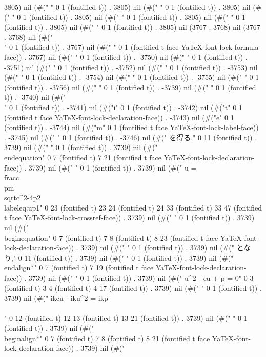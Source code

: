 3805) nil (#(" " 0 1 (fontified t)) . 3805) nil (#(" " 0 1 (fontified t)) . 3805) nil (#(" " 0 1 (fontified t)) . 3805) nil (#(" " 0 1 (fontified t)) . 3805) nil (#(" " 0 1 (fontified t)) . 3805) nil (#(" " 0 1 (fontified t)) . 3805) nil (3767 . 3768) nil (3767 . 3768) nil (#("\\" 0 1 (fontified t)) . 3767) nil (#("	" 0 1 (fontified t face YaTeX-font-lock-formula-face)) . 3767) nil (#(" " 0 1 (fontified t)) . -3750) nil (#(" " 0 1 (fontified t)) . -3751) nil (#(" " 0 1 (fontified t)) . -3752) nil (#(" " 0 1 (fontified t)) . -3753) nil (#(" " 0 1 (fontified t)) . -3754) nil (#(" " 0 1 (fontified t)) . -3755) nil (#(" " 0 1 (fontified t)) . -3756) nil (#("
" 0 1 (fontified t)) . -3739) nil (#(" " 0 1 (fontified t)) . -3740) nil (#("\\" 0 1 (fontified t)) . -3741) nil (#("i" 0 1 (fontified t)) . -3742) nil (#("t" 0 1 (fontified t face YaTeX-font-lock-declaration-face)) . -3743) nil (#("e" 0 1 (fontified t)) . -3744) nil (#("m" 0 1 (fontified t face YaTeX-font-lock-label-face)) . -3745) nil (#(" " 0 1 (fontified t)) . -3746) nil (#("       を得る." 0 11 (fontified t)) . 3739) nil (#("
" 0 1 (fontified t)) . 3739) nil (#("       \\end{equation}" 0 7 (fontified t) 7 21 (fontified t face YaTeX-font-lock-declaration-face)) . 3739) nil (#("
" 0 1 (fontified t)) . 3739) nil (#("	u = \\frac{c\\pm\\sqrt{c^2-4p}}{2} \\label{eq:up1}" 0 23 (fontified t) 23 24 (fontified t) 24 33 (fontified t) 33 47 (fontified t face YaTeX-font-lock-crossref-face)) . 3739) nil (#("
" 0 1 (fontified t)) . 3739) nil (#("       \\begin{equation}" 0 7 (fontified t) 7 8 (fontified t) 8 23 (fontified t face YaTeX-font-lock-declaration-face)) . 3739) nil (#("
" 0 1 (fontified t)) . 3739) nil (#("       となり," 0 11 (fontified t)) . 3739) nil (#("
" 0 1 (fontified t)) . 3739) nil (#("       \\end{align*}" 0 7 (fontified t) 7 19 (fontified t face YaTeX-font-lock-declaration-face)) . 3739) nil (#("
" 0 1 (fontified t)) . 3739) nil (#("	u^2 - cu + p = 0" 0 3 (fontified t) 3 4 (fontified t) 4 17 (fontified t)) . 3739) nil (#("
" 0 1 (fontified t)) . 3739) nil (#("	ikcu - iku^2 = ikp\\\\" 0 12 (fontified t) 12 13 (fontified t) 13 21 (fontified t)) . 3739) nil (#("
" 0 1 (fontified t)) . 3739) nil (#("       \\begin{align*}" 0 7 (fontified t) 7 8 (fontified t) 8 21 (fontified t face YaTeX-font-lock-declaration-face)) . 3739) nil (#("
